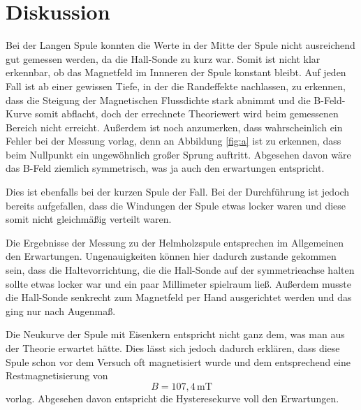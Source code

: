 \section{Diskussion}
Bei der Langen Spule konnten die Werte in der Mitte
der Spule nicht ausreichend gut gemessen werden, da
die Hall-Sonde zu kurz war. Somit ist nicht klar erkennbar,
ob das Magnetfeld im Innneren der Spule konstant bleibt.
Auf jeden Fall ist ab einer gewissen Tiefe, in
der die Randeffekte nachlassen, zu erkennen, dass
die Steigung der Magnetischen Flussdichte stark abnimmt und
die B-Feld-Kurve somit abflacht, doch der errechnete Theoriewert wird
beim gemessenen Bereich nicht erreicht. Außerdem ist noch anzumerken,
dass wahrscheinlich ein Fehler bei der Messung vorlag, denn
an Abbildung \ref{fig:a}  ist zu erkennen, dass beim
Nullpunkt ein ungewöhnlich großer Sprung auftritt. 
Abgesehen davon wäre das B-Feld ziemlich symmetrisch,
was ja auch den erwartungen entspricht.

Dies ist ebenfalls bei der kurzen Spule der Fall.
Bei der Durchführung ist jedoch bereits aufgefallen,
dass die Windungen der Spule etwas locker waren und
diese somit nicht gleichmäßig verteilt waren.

Die Ergebnisse der Messung zu der Helmholzspule entsprechen
im Allgemeinen den Erwartungen. Ungenauigkeiten
können hier dadurch zustande gekommen sein, dass
die Haltevorrichtung, die die Hall-Sonde auf der
symmetrieachse halten sollte etwas locker war und 
ein paar Millimeter spielraum ließ. Außerdem musste
die Hall-Sonde senkrecht zum Magnetfeld per Hand
ausgerichtet werden und das ging nur nach Augenmaß.

Die Neukurve der Spule mit Eisenkern entspricht
nicht ganz dem, was man aus der Theorie erwartet hätte.
Dies lässt sich jedoch dadurch erklären, dass diese
Spule schon vor dem Versuch oft magnetisiert wurde und
dem entsprechend eine Restmagnetisierung von
\begin{equation}
    B=107,4\,\si{\milli\tesla}\nonumber
\end{equation}
\noindent vorlag.
Abgesehen davon entspricht die Hysteresekurve voll den
Erwartungen.